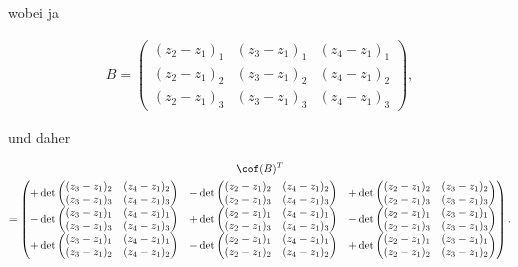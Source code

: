 \begin{solution}
wobei ja

\begin{align*}
  B
  =
  \begin{pmatrix}
    (z_2 - z_1)_1 & (z_3 - z_1)_1 & (z_4 - z_1)_1 \\
    (z_2 - z_1)_2 & (z_3 - z_1)_2 & (z_4 - z_1)_2 \\
    (z_2 - z_1)_3 & (z_3 - z_1)_3 & (z_4 - z_1)_3
  \end{pmatrix},
\end{align*}

und daher

\begin{multline*}
  \cof(B)^T \\
  =
  \begin{pmatrix}
    +
    \det
    \begin{pmatrix}
      (z_3 - z_1)_2 & (z_4 - z_1)_2 \\
      (z_3 - z_1)_3 & (z_4 - z_1)_3
    \end{pmatrix}
    &
    -
    \det
    \begin{pmatrix}
      (z_2 - z_1)_2 & (z_4 - z_1)_2 \\
      (z_2 - z_1)_3 & (z_4 - z_1)_3
    \end{pmatrix}
    &
    +
    \det
    \begin{pmatrix}
      (z_2 - z_1)_2 & (z_3 - z_1)_2 \\
      (z_2 - z_1)_3 & (z_3 - z_1)_3
    \end{pmatrix}
    \\
    -
    \det
    \begin{pmatrix}
      (z_3 - z_1)_1 & (z_4 - z_1)_1 \\
      (z_3 - z_1)_3 & (z_4 - z_1)_3
    \end{pmatrix}
    &
    +
    \det
    \begin{pmatrix}
      (z_2 - z_1)_1 & (z_4 - z_1)_1 \\
      (z_2 - z_1)_3 & (z_4 - z_1)_3
    \end{pmatrix}
    &
    -
    \det
    \begin{pmatrix}
      (z_2 - z_1)_1 & (z_3 - z_1)_1 \\
      (z_2 - z_1)_3 & (z_3 - z_1)_3
    \end{pmatrix}
    \\
    +
    \det
    \begin{pmatrix}
      (z_3 - z_1)_1 & (z_4 - z_1)_1 \\
      (z_3 - z_1)_2 & (z_4 - z_1)_2
    \end{pmatrix}
    &
    -
    \det
    \begin{pmatrix}
      (z_2 - z_1)_1 & (z_4 - z_1)_1 \\
      (z_2 - z_1)_2 & (z_4 - z_1)_2
    \end{pmatrix}
    &
    +
    \det
    \begin{pmatrix}
      (z_2 - z_1)_1 & (z_3 - z_1)_1 \\
      (z_2 - z_1)_2 & (z_3 - z_1)_2
    \end{pmatrix}
  \end{pmatrix}.
\end{multline*}


\end{solution}

